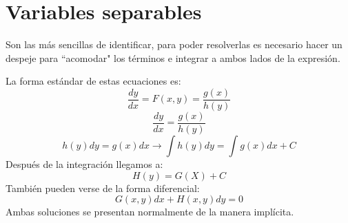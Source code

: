 \documentclass[11pt,fleqn]{book} %
\begin{document}
\section{Variables separables}
Son las más sencillas de identificar, para poder resolverlas es necesario hacer un despeje para ``acomodar" los términos e integrar a ambos lados de la expresión.
\begin{definition}
La forma estándar de estas ecuaciones es:\\
\begin{displaymath}
\frac{dy}{dx}=F(x,y)=\frac{g(x)}{h(y)}
\end{displaymath}
\begin{displaymath}
\frac{dy}{dx}=\frac{g(x)}{h(y)}
\end{displaymath}
\begin{displaymath}
h(y)dy=g(x)dx \rightarrow \int h(y)dy=\int g(x)dx + C
\end{displaymath}
Después de la integración llegamos a:
\begin{displaymath}
H(y)=G(X)+C
\end{displaymath}
También pueden verse de la forma diferencial:\\
\begin{equation}\label{eq:edprimerorden}
G(x,y)dx+H(x,y)dy=0
\end{equation}
Ambas soluciones se presentan normalmente de la manera implícita.
\end{definition}
\end{document}
